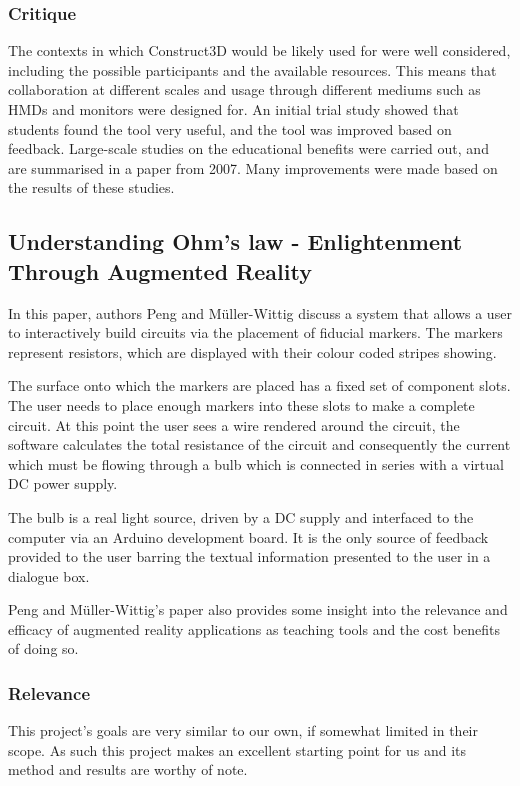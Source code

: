 \subsubsection{Critique}
The contexts in which Construct3D would be likely used for were well considered, including the possible participants and the available resources. This means that collaboration at different scales and usage through different mediums such as HMDs and monitors were designed for. An initial trial study showed that students found the tool very useful, and the tool was improved based on feedback. Large-scale studies on the educational benefits were carried out, and are summarised in a paper from 2007\cite{Kaufmann07}. Many improvements were made based on the results of these studies.

\subsection{Understanding Ohm's law - Enlightenment Through Augmented Reality}
In this paper\cite{peng2010understanding}, authors Peng and M\"{u}ller-Wittig discuss a system that allows a user to interactively build circuits via the placement of fiducial markers. The markers represent resistors, which are displayed with their colour coded stripes showing.

The surface onto which the markers are placed has a fixed set of component slots. The user needs to place enough markers into these slots to make a complete circuit. At this point the user sees a wire rendered around the circuit, the software calculates the total resistance of the circuit and consequently the current which must be flowing through a bulb which is connected in series with a virtual DC power supply.

The bulb is a real light source, driven by a DC supply and interfaced to the computer via an Arduino development board. It is the only source of feedback provided to the user barring the textual information presented to the user in a dialogue box.

Peng and M\"{u}ller-Wittig's paper also provides some insight into the relevance and efficacy of augmented reality applications as teaching tools and the cost benefits of doing so.

\subsubsection{Relevance}
This project's goals are very similar to our own, if somewhat limited in their scope. As such this project makes an excellent starting point for us and its method and results are worthy of note.

